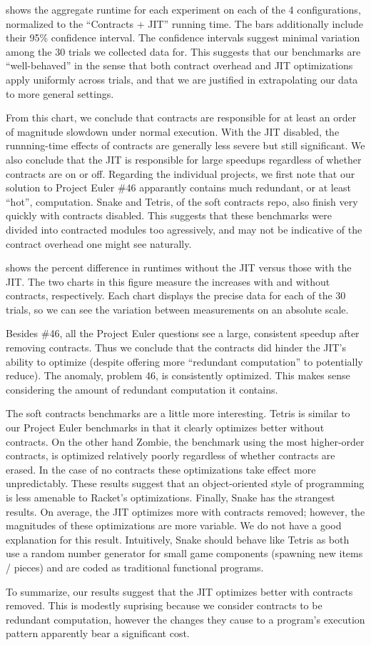 


 shows the aggregate runtime for each experiment on each of the 4 configurations, normalized to the ``Contracts + JIT'' running time.
The bars additionally include their 95\% confidence interval.
The confidence intervals suggest minimal variation among the 30 trials we collected data for.
This suggests that our benchmarks are ``well-behaved'' in the sense that both contract overhead and JIT optimizations apply uniformly across trials, and that we are justified in extrapolating our data to more general settings.

From this chart, we conclude that contracts are responsible for at least an order of magnitude slowdown under normal execution.
With the JIT disabled, the runnning-time effects of contracts are generally less severe but still significant.
We also conclude that the JIT is responsible for large speedups regardless of whether contracts are on or off.
Regarding the individual projects, we first note that our solution to Project Euler \#46 apparantly contains much redundant, or at least ``hot'', computation.
Snake and Tetris, of the soft contracts repo, also finish very quickly with contracts disabled.
This suggests that these benchmarks were divided into contracted modules too agressively, and may not be indicative of the contract overhead one might see naturally.

 shows the percent difference in runtimes without the JIT versus those with the JIT.
The two charts in this figure measure the increases with and without contracts, respectively.
Each chart displays the precise data for each of the 30 trials, so we can see the variation between measurements on an absolute scale.

Besides \#46, all the Project Euler questions see a large, consistent speedup after removing contracts.
Thus we conclude that the contracts did hinder the JIT's ability to optimize (despite offering more ``redundant computation'' to potentially reduce).
The anomaly, problem 46, is consistently optimized.
This makes sense considering the amount of redundant computation it contains.

The soft contracts benchmarks are a little more interesting.
Tetris is similar to our Project Euler benchmarks in that it clearly optimizes better without contracts.
On the other hand Zombie, the benchmark using the most higher-order contracts, is optimized relatively poorly regardless of whether contracts are erased.
In the case of no contracts these optimizations take effect more unpredictably.
These results suggest that an object-oriented style of programming is less amenable to Racket's optimizations.
Finally, Snake has the strangest results.
On average, the JIT optimizes more with contracts removed; however, the magnitudes of these optimizations are more variable.
We do not have a good explanation for this result.
Intuitively, Snake should behave like Tetris as both use a random number generator for small game components (spawning new items / pieces) and are coded as traditional functional programs.

To summarize, our results suggest that the JIT optimizes better with contracts removed.
This is modestly suprising because we consider contracts to be redundant computation, however the changes they cause to a program's execution pattern apparently bear a significant cost.

